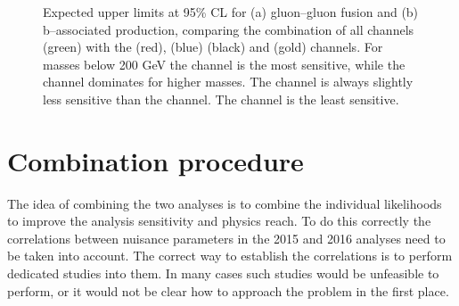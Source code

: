 \begin{figure}[h!]
\begin{center}
\end{center}
\caption{Expected upper limits at 95\% CL for (a) gluon--gluon fusion and (b) b--associated production,
comparing the combination of all channels (green) with the \mutau (red), \etau (blue) \tautau (black)
and \emu (gold) channels. For masses below 200 GeV the \mutau channel is the most sensitive,
while the \tautau channel dominates for higher masses. The \etau channel is always
slightly less sensitive than the \mutau channel. The \emu channel is the least sensitive.}
\label{fig:mssm_results_limits_breakdown_hig16006}
\end{figure}
\clearpage


\section{Combination procedure}
\label{sec:mssm_combination_procedure}
The idea of combining the two analyses is to combine the 
individual likelihoods to improve the analysis sensitivity and
physics reach. To do this correctly the correlations between
nuisance parameters in the 2015 and 2016 analyses need to be taken into account.
The correct way to establish the correlations is to perform
dedicated studies into them. In many cases such studies would be 
unfeasible to perform, or it would not be clear how to approach the 
problem in the first place.


